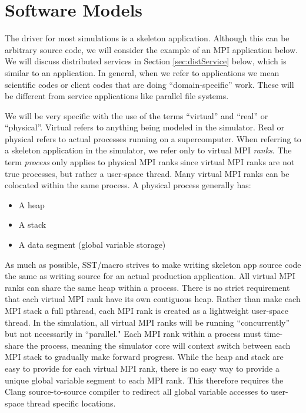 
\chapter{Software Models}
\label{chapter:software}

The driver for most simulations is a skeleton application.
Although this can be arbitrary source code, we will consider the example of an MPI application below.
We will discuss distributed services in Section \ref{sec:distService} below, which is similar to an application.  In general, when we refer to applications we mean scientific codes or client codes that are doing ``domain-specific'' work.  These will be different from service applications like parallel file systems.

We will be very specific with the use of the terms ``virtual'' and ``real'' or ``physical''.  
Virtual refers to anything being modeled in the simulator. 
Real or physical refers to actual processes running on a supercomputer.
When referring to a skeleton application in the simulator, we refer only to virtual MPI \emph{ranks}.
The term \emph{process} only applies to physical MPI ranks since virtual MPI ranks are not true processes, 
but rather a user-space thread.  
Many virtual MPI ranks can be colocated within the same process. A physical process generally has:
\begin{itemize}
\item A heap
\item A stack
\item A data segment (global variable storage)
\end{itemize}

As much as possible, SST/macro strives to make writing skeleton app source code the same as writing source for an actual production application.
All virtual MPI ranks can share the same heap within a process.
There is no strict requirement that each virtual MPI rank have its own contiguous heap.
Rather than make each MPI stack a full pthread, each MPI rank is created as a lightweight user-space thread.
In the simulation, all virtual MPI ranks will be running ``concurrently'' but not necessarily in ``parallel."
Each MPI rank within a process must time-share the process,
meaning the simulator core will context switch between each MPI stack to gradually make forward progress.
While the heap and stack are easy to provide for each virtual MPI rank,
there is no easy way to provide a unique global variable segment to each MPI rank.
This therefore requires the Clang source-to-source compiler to redirect all global variable accesses to user-space thread specific locations.

